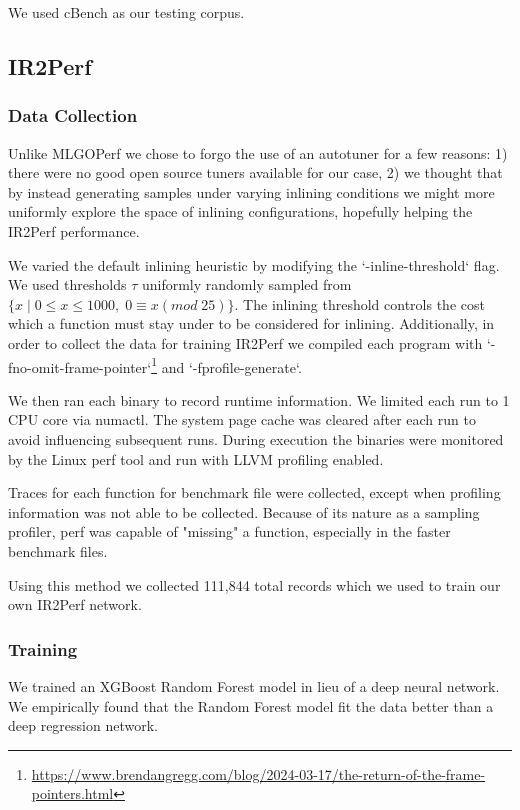 \documentclass[nohyperref]{article}
\theoremstyle{plain}
\theoremstyle{definition}
\theoremstyle{remark}
\begin{document}
We used cBench as our testing corpus.

\subsection{IR2Perf}
\subsubsection{Data Collection}
Unlike MLGOPerf we chose to forgo the use of an autotuner for a few reasons: 1) there were no good open source tuners available for our case, 2) we thought that by instead generating samples under varying inlining conditions we might more uniformly explore the space of inlining configurations, hopefully helping the IR2Perf performance.

We varied the default inlining heuristic by modifying the `-inline-threshold` flag. We used thresholds $\tau$ uniformly randomly sampled from $\bigr\{x\;|\;0 \leq x \leq 1000,\;0 \equiv x (mod\;25)\bigr\}$. The inlining threshold controls the cost which a function must stay under to be considered for inlining. Additionally, in order to collect the data for training IR2Perf we compiled each program with `-fno-omit-frame-pointer`\footnote{\href{https://www.brendangregg.com/blog/2024-03-17/the-return-of-the-frame-pointers.html}{https://www.brendangregg.com/blog/2024-03-17/the-return-of-the-frame-pointers.html}} and `-fprofile-generate`.

We then ran each binary to record runtime information. We limited each run to 1 CPU core via numactl. The system page cache was cleared after each run to avoid influencing subsequent runs. During execution the binaries were monitored by the Linux perf tool and run with LLVM profiling enabled.


Traces for each function for benchmark file were collected, except when profiling information was not able to be collected. Because of its nature as a sampling profiler, perf was capable of "missing" a function, especially in the faster benchmark files.

Using this method we collected 111,844 total records which we used to train our own IR2Perf network.

\subsubsection{Training}
We trained an XGBoost Random Forest model in lieu of a deep neural network. We empirically found that the Random Forest model fit the data better than a deep regression network. %
\end{document}
